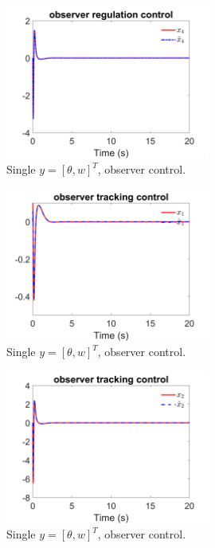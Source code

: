 \documentclass[12pt]{article}
\numberwithin{equation}{section}
\begin{document}
\begin{figure}[!ht]
    \centering
    \includegraphics[width=0.6\textwidth]{double_output_observer/fig8.png}
    \caption{Single $y = [\theta,w]^T$, observer control.}
\end{figure}

\begin{figure}[!ht]
    \centering
    \includegraphics[width=0.6\textwidth]{double_output_observer/fig9.png}
    \caption{Single $y = [\theta,w]^T$, observer control.}
\end{figure}

\begin{figure}[!ht]
    \centering
    \includegraphics[width=0.6\textwidth]{double_output_observer/fig10.png}
    \caption{Single $y = [\theta,w]^T$, observer control.}
\end{figure}
\end{document}
